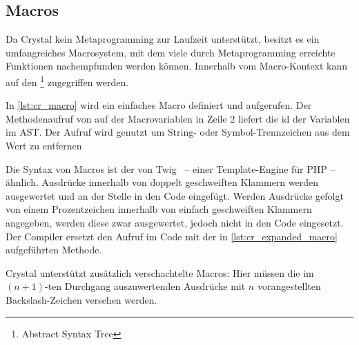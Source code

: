 \subsection{Macros}
\label{ssec:gc_macros}

Da Crystal kein Metaprogramming zur Laufzeit unterstützt, besitzt es ein
umfangreiches Macrosystem, mit dem viele durch Metaprogramming erreichte
Funktionen nachempfunden werden können.  Innerhalb vom Macro-Kontext kann auf
den  \footnote{Abstract Syntax Tree} zugegriffen werden.

In \cref{lst:cr_macro} wird ein einfaches Macro definiert und aufgerufen.
Der Methodenaufruf von  auf der Macrovariablen  in Zeile 2
liefert die id der Variablen im AST.  Der Aufruf wird genutzt um String- oder
Symbol-Trennzeichen aus dem Wert zu entfernen




Die Syntax von Macros ist der von Twig~\cite{twig} -- einer Template-Engine für
PHP -- ähnlich.  Ausdrücke innerhalb von doppelt geschweiften Klammern werden
ausgewertet und an der Stelle in den Code eingefügt.  Werden Ausdrücke gefolgt
von einem Prozentzeichen innerhalb von einfach geschweiften Klammern angegeben,
werden diese zwar ausgewertet, jedoch nicht in den Code eingesetzt.  Der
Compiler ersetzt den Aufruf im Code mit der in \cref{lst:cr_expanded_macro}
aufgeführten Methode.



Crystal unterstützt zusätzlich verschachtelte Macros:  Hier müssen die im $(n +
1)$-ten Durchgang auszuwertenden Ausdrücke mit $n$ vorangestellten
Backslash-Zeichen versehen werden.
